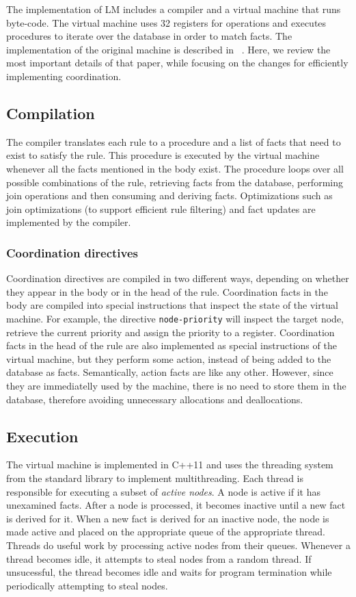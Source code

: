 The implementation of LM includes a compiler and a virtual machine that runs
byte-code. The virtual machine uses 32 registers for
operations and executes procedures to iterate over the database in order to match facts.
The implementation of the original machine is described in ~\cite{cruz-ppdp14}.
Here, we review the most important details of that paper, while focusing on the
changes for efficiently implementing coordination.

\subsection{Compilation}

The compiler translates each rule to a procedure and a list of facts that need
to exist to satisfy the rule. This procedure is executed by the virtual
machine whenever all the facts mentioned in the body exist.
The procedure loops over all possible combinations of the rule, retrieving facts from the
database, performing join operations and then consuming and deriving facts.
Optimizations such as join optimizations (to support efficient rule filtering)
and fact updates are implemented by the compiler.

\subsubsection{Coordination directives}

Coordination directives are compiled in two different ways, depending on whether they
appear in the body or in the head of the rule. Coordination facts in the body
are compiled into special instructions that inspect the state of the virtual
machine. For example, the directive \texttt{node-priority} will inspect the
target node, retrieve the current priority and assign the priority to a
register. Coordination facts in the head of the rule are also implemented as
special instructions of the virtual machine, but they perform some action,
instead of being added to the database as facts.
Semantically, action facts are like any other. However, since they are
immediatelly used by the machine, there is no need to store them in the
database, therefore avoiding unnecessary allocations and deallocations.

\subsection{Execution}

The virtual machine is implemented in C++11 and uses the threading system from
the standard library to implement multithreading. Each thread is responsible for
executing a subset of \emph{active nodes}. A node is active if it has unexamined
facts. After a node is processed, it becomes inactive until a new fact is
derived for it. When a new fact is derived for an
inactive node, the node is made active and placed on the appropriate queue of
the appropriate thread.  Threads do useful work by processing active nodes from their queues. Whenever a
thread becomes idle, it attempts to steal nodes from a random thread.
If unsucessful, the thread becomes idle and waits for program
termination while periodically attempting to steal nodes.

